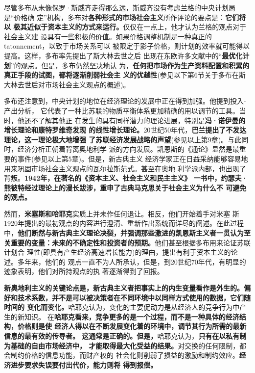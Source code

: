 尽管多布从未像保罗·斯威齐走得那么远，斯威齐没有考虑兰格的中央计划局是“价格确
定”机构，多布对\textbf{各种形式的市场社会主义}所作评论的要点是：\textbf{它们将以
  极其近似于资本主义的方式来运行。}仅仅在一点上，他才认为兰格的观点对于社会主义建
设具有一些积极的价值。如果价格调整机制是一种真正的tatonnement，以致于市场关系可以
被限定于影子价格，则计划的效率就可能得以提高。这样，多布率先提出了斯大林去世之后
出现在东欧许多文献中的“\textbf{最优化计划}”的观点。但是，多布仍然坚决地认
为，\textbf{任何把市场作为生产资料配置和积累的真正手段的试图，都将逐渐削弱社会主
  义的优越性}(参见以下第6节关于多布在斯大林去世后对市场社会主义观点的概述)。

多布还注意到，中央计划的地位在经济理论的发展中正在得到加强。他提到投入-产出分析，
它代表了一种比苏联的物质平衡体系更加精确的用以调节的工具。当时，他还不了解其他正
在发生的具有同样潜力的理论进展，特别是\textbf{冯·诺伊曼的增长理论和康特罗维奇发现
  的线性增长理论。}20世纪50年代，\textbf{巴兰提出了不发达理论，这一理论极大地增强
  了苏联经济发展战略的声望}(参见以上第9章)。与此同时，经济分析正朝着背离奥地利学
派的方向发展。凯恩斯的《通论》显然是最重要的事件(参见以上第5章)。但是，新古典主义
经济学家正在日益采纳能够容易地用来巩固市场社会主义观点的瓦尔拉斯范式。甚至在奥地
利学派内部，也出现了背叛。\textbf{1942年，在著名的《资本主义、社会主义和民主主义》
  一书中，约瑟夫·熊彼特经过理论上的漫长跋涉，重申了古典马克思关于社会主义为什么不
  可避免的观点。}

然而，\textbf{米塞斯和哈耶克}实质上并未作任何退让。相反，他们开始着手对米塞
斯1920年提出的最初观点的内容进行澄清、重新作出系统而详尽的阐述。在此过程
中，\textbf{他们断然与新古典主义理论决裂，并强调那些激进的凯恩斯主义者一贯认为至
  关重要的变量：未来的不确定性和投资者的预期。}他们甚至根据多布用来论证苏联计划合
理性(即具有产生经济高速增长能力)的理由，提出有利于资本主义的论述。多年来，他们的
观点一直不为人所承认，但是，到20世纪70年代，有明显的迹象表明，他们对所持观点的执
著逐渐得到了回报。

\textbf{新奥地利主义的关键论点是，新古典主义者把事实上的内生变量看作是外生的。偏
  好和技术系数，并不是可以被决策者在不同环境中以同样方式使用的数据，它们随时间的
  变化而变化。}哈耶克认为，变化的主要促动力是从经济人的竞争行为中产生的新知识。
在\textbf{哈耶克看来，竞争更多的是一个过程，而不是一种具体的经济结构，价格则是使
  经济人得以在不断发展变化着的环境中，调节其行为所需的最新信息的最有效的传导者。
  这通常是正确的。但是，}哈耶克认为，\textbf{只有在以私有制为基础的自由市场经济中，
  才能取得最大化受益的结果。}对交换的任何限制，都会制约价格的信息功能，而财产权的
社会化则削弱了损益的激励和制约效应。\textbf{经济进步要求失误要付出代价，能力则将
  得到报偿。}

